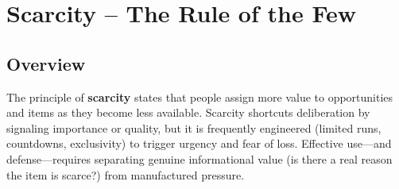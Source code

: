 \section{Scarcity – The Rule of the Few}

\subsection*{Overview}
The principle of \textbf{scarcity} states that people assign more value to opportunities and items as they become less available. Scarcity shortcuts deliberation by signaling importance or quality, but it is frequently engineered (limited runs, countdowns, exclusivity) to trigger urgency and fear of loss. Effective use—and defense—requires separating genuine informational value (is there a real reason the item is scarce?) from manufactured pressure.

